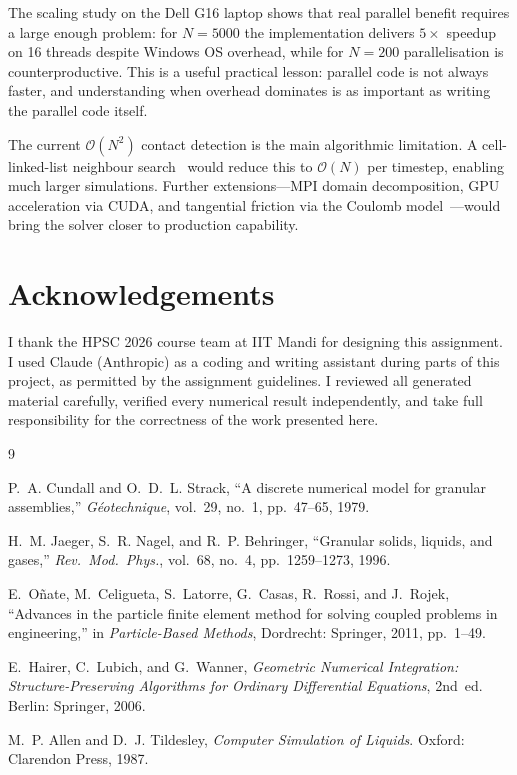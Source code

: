 \documentclass[10pt,twocolumn]{article}
\begin{document}
The scaling study on the Dell G16 laptop shows that real parallel benefit
requires a large enough problem: for $N=5000$ the implementation delivers
$5\times$ speedup on 16 threads despite Windows OS overhead, while for
$N=200$ parallelisation is counterproductive.
This is a useful practical lesson: parallel code is not always faster, and
understanding when overhead dominates is as important as writing the
parallel code itself.

The current $\mathcal{O}(N^2)$ contact detection is the main algorithmic
limitation.
A cell-linked-list neighbour search~\cite{Allen1987} would reduce this to
$\mathcal{O}(N)$ per timestep, enabling much larger simulations.
Further extensions---MPI domain decomposition, GPU acceleration via CUDA,
and tangential friction via the Coulomb model~\cite{Cundall1979}---would
bring the solver closer to production capability.

\section*{Acknowledgements}

I thank the HPSC 2026 course team at IIT Mandi for designing this assignment.
I used Claude (Anthropic) as a coding and writing assistant during parts of
this project, as permitted by the assignment guidelines.
I reviewed all generated material carefully, verified every numerical result
independently, and take full responsibility for the correctness of the work
presented here.

\begin{thebibliography}{9}

P.~A. Cundall and O.~D.~L. Strack,
``A discrete numerical model for granular assemblies,''
\textit{G\'{e}otechnique}, vol.~29, no.~1, pp.~47--65, 1979.

H.~M. Jaeger, S.~R. Nagel, and R.~P. Behringer,
``Granular solids, liquids, and gases,''
\textit{Rev.\ Mod.\ Phys.}, vol.~68, no.~4, pp.~1259--1273, 1996.

E.~O\~{n}ate, M.~Celigueta, S.~Latorre, G.~Casas, R.~Rossi, and J.~Rojek,
``Advances in the particle finite element method for solving coupled
problems in engineering,''
in \textit{Particle-Based Methods}, Dordrecht: Springer, 2011, pp.~1--49.

E.~Hairer, C.~Lubich, and G.~Wanner,
\textit{Geometric Numerical Integration: Structure-Preserving Algorithms
for Ordinary Differential Equations}, 2nd~ed.
Berlin: Springer, 2006.

M.~P. Allen and D.~J. Tildesley,
\textit{Computer Simulation of Liquids}.
Oxford: Clarendon Press, 1987.

\end{thebibliography}
\end{document}
